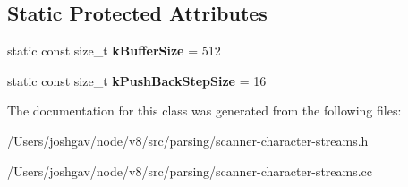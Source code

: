 \subsection*{Static Protected Attributes}
\begin{DoxyCompactItemize}
\item 
static const size\+\_\+t {\bfseries k\+Buffer\+Size} = 512\hypertarget{classv8_1_1internal_1_1_buffered_utf16_character_stream_a6c0a37f0a5fb8c2806476c3db3acb84f}{}\label{classv8_1_1internal_1_1_buffered_utf16_character_stream_a6c0a37f0a5fb8c2806476c3db3acb84f}

\item 
static const size\+\_\+t {\bfseries k\+Push\+Back\+Step\+Size} = 16\hypertarget{classv8_1_1internal_1_1_buffered_utf16_character_stream_a3f6c44c74f9d9257290fd5d165da1b35}{}\label{classv8_1_1internal_1_1_buffered_utf16_character_stream_a3f6c44c74f9d9257290fd5d165da1b35}

\end{DoxyCompactItemize}


The documentation for this class was generated from the following files\+:\begin{DoxyCompactItemize}
\item 
/\+Users/joshgav/node/v8/src/parsing/scanner-\/character-\/streams.\+h\item 
/\+Users/joshgav/node/v8/src/parsing/scanner-\/character-\/streams.\+cc\end{DoxyCompactItemize}
